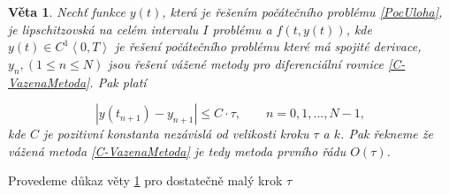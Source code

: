 \documentclass[a4paper,12pt,twoside]{article}
\newtheorem{veta}{Věta}[section]
\theoremstyle{definition}
\theoremstyle{remark}
\numberwithin{equation}{section}
\numberwithin{table}{section}
\numberwithin{figure}{section}
\begin{document}
\begin{veta} \label{RadEulerovyMetody}%
	Nechť funkce $y\left(t\right)$, která je řešením počátečního problému \eqref{PocUloha}, je lipschitzovská na celém intervalu $I$ problému a $f \left(t,y \left(t\right)\right)$, kde $y\left(t\right) \in C^{1}\left\langle 0, T\right\rangle$ je řešení počátečního problému které má spojité derivace,
	$y_{n}, \left(1 \leq n \leq N\right)$ jsou řešení vážené metody pro diferenciální rovnice \eqref{C-VazenaMetoda}. Pak platí
	
	\begin{equation}
		|y\left(t_{n+1}\right) - y_{n+1}| \leq C\cdot \tau, \qquad n = 0,1, ..., N-1,
	\end{equation} 
	kde $C$ je pozitivní konstanta nezávislá od velikosti kroku $\tau$  a $k$. Pak řekneme že vážená metoda \eqref{C-VazenaMetoda} je tedy metoda prvního řádu $O\left(\tau\right)$. \cite{Cangpin}
\end{veta}
Provedeme důkaz věty \ref{RadEulerovyMetody} pro dostatečně malý krok $\tau$
\end{document}
